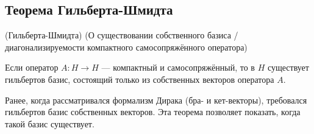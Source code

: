 \documentclass[12pt]{article}
\begin{document}
	\subsection{Теорема Гильберта-Шмидта}

		\begin{theorem}
			(Гильберта-Шмидта) (О существовании {\color{gray}собственного} базиса
			/диагонализируемости компактного самосопряжённого оператора)
		
			Если оператор $A : H \rightarrow H$ --- компактный и самосопряжённый, то в $H$ существует гильбертов 
			базис, состоящий только из собственных векторов оператора $A$.
		\end{theorem}
		Ранее, когда рассматривался формализм Дирака (бра- и кет-векторы), требовался гильбертов базис собственных
		векторов. Эта теорема позволяет показать, когда такой базис существует.
\end{document}
